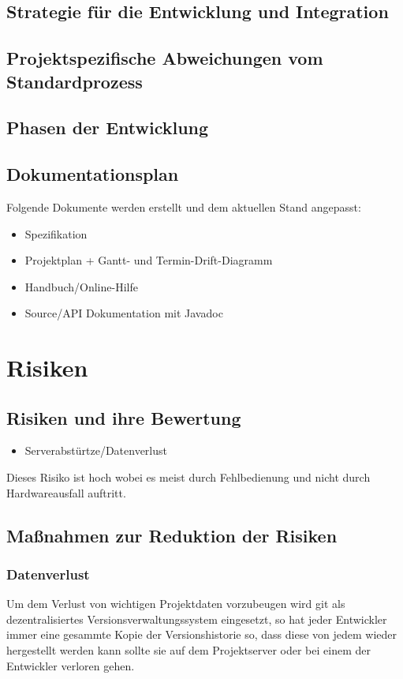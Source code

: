 \documentclass[a4paper,10pt]{scrartcl}
\begin{document}
\subsection{Strategie für die Entwicklung und Integration}
\subsection{Projektspezifische Abweichungen vom Standardprozess}
\subsection{Phasen der Entwicklung}
\subsection{Dokumentationsplan}
Folgende Dokumente werden erstellt und dem aktuellen Stand angepasst:
\begin{itemize}
\item Spezifikation
\item Projektplan + Gantt- und Termin-Drift-Diagramm
\item Handbuch/Online-Hilfe
\item Source/API Dokumentation mit Javadoc
\end{itemize}

\section{Risiken}
\subsection{Risiken und ihre Bewertung}
\begin{itemize}
\item Serverabstürtze/Datenverlust
\end{itemize}
Dieses Risiko ist hoch wobei es meist durch Fehlbedienung und nicht durch Hardwareausfall auftritt.
\subsection{Maßnahmen zur Reduktion der Risiken}
\subsubsection{Datenverlust}
Um dem Verlust von wichtigen Projektdaten vorzubeugen wird git als dezentralisiertes Versionsverwaltungssystem eingesetzt,
so hat jeder Entwickler immer eine gesammte Kopie der Versionshistorie so, dass diese von jedem wieder hergestellt werden kann
sollte sie auf dem Projektserver oder bei einem der Entwickler verloren gehen.
\end{document}
